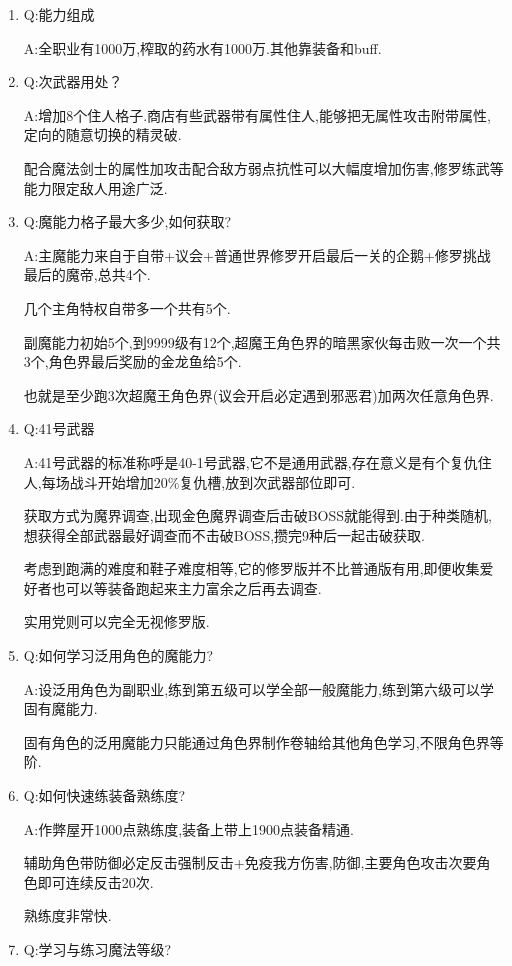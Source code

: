 \begin{enumerate}
	\item
	Q:能力组成

	A:全职业有1000万,榨取的药水有1000万.其他靠装备和buff.

	\item
	Q:次武器用处？

	A:增加8个住人格子.商店有些武器带有属性住人,能够把无属性攻击附带属性,定向的随意切换的精灵破.

	配合魔法剑士的属性加攻击配合敌方弱点抗性可以大幅度增加伤害,修罗练武等能力限定敌人用途广泛.

	\item
	Q:魔能力格子最大多少,如何获取?

	A:主魔能力来自于自带+议会+普通世界修罗开启最后一关的企鹅+修罗挑战最后的魔帝,总共4个.

	几个主角特权自带多一个共有5个.
	
	副魔能力初始5个,到9999级有12个,超魔王角色界的暗黑家伙每击败一次一个共3个,角色界最后奖励的金龙鱼给5个.

	也就是至少跑3次超魔王角色界(议会开启必定遇到邪恶君)加两次任意角色界.

	\item
	Q:41号武器

	A:41号武器的标准称呼是40-1号武器,它不是通用武器,存在意义是有个复仇住人,每场战斗开始增加20\%复仇槽,放到次武器部位即可.

	获取方式为魔界调查,出现金色魔界调查后击破BOSS就能得到.由于种类随机,想获得全部武器最好调查而不击破BOSS,攒完9种后一起击破获取.

	考虑到跑满的难度和鞋子难度相等,它的修罗版并不比普通版有用,即便收集爱好者也可以等装备跑起来主力富余之后再去调查.

	实用党则可以完全无视修罗版.

	\item
	Q:如何学习泛用角色的魔能力?

	A:设泛用角色为副职业,练到第五级可以学全部一般魔能力,练到第六级可以学固有魔能力.

	固有角色的泛用魔能力只能通过角色界制作卷轴给其他角色学习,不限角色界等阶.

	\item
	Q:如何快速练装备熟练度?

	A:作弊屋开1000点熟练度,装备上带上1900点装备精通.

	辅助角色带防御必定反击强制反击+免疫我方伤害,防御,主要角色攻击次要角色即可连续反击20次.

	熟练度非常快.

	\item
	Q:学习与练习魔法等级?
	

\end{enumerate}
